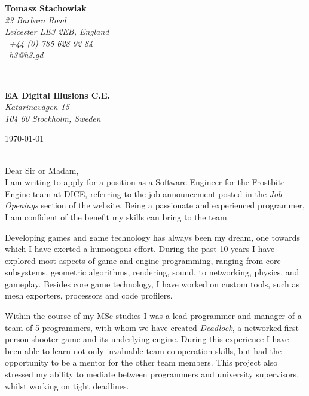 \documentclass[11pt]{article}
\begin{document}
\hfill%
\begin{minipage}[t]{.6\textwidth}
\raggedleft%
{\bfseries Tomasz Stachowiak}\\[.35ex]
\small\itshape%
23 Barbara Road\\
Leicester LE3 2EB, England\\[.35ex]
\Telefon~+44 (0) 785 628 92 84\\
\Letter~\href{mailto:h3@h3.gd}{h3@h3.gd}
\end{minipage}\\[1em]
%
\begin{minipage}[t]{.4\textwidth}
\raggedright%
{\bfseries EA Digital Illusions C.E.}\\[.35ex]
\small\itshape%
Katarinavägen 15\\
104 60 Stockholm, Sweden
\end{minipage}
\hfill %
\begin{minipage}[t]{.4\textwidth}
\raggedleft %
\today
\end{minipage}\\[2em]
Dear Sir or Madam,\\[1.5em]
%
I am writing to apply for a position as a Software Engineer for the Frostbite Engine team at DICE, referring to the job announcement posted in the \emph{Job Openings} section of the website. Being a passionate and experienced programmer, I am confident of the benefit my skills can bring to the team.

Developing games and game technology has always been my dream, one towards which I have exerted a humongous effort. During the past 10 years I have explored most aspects of game and engine programming, ranging from core subsystems, geometric algorithms, rendering, sound, to networking, physics, and gameplay. Besides core game technology, I have worked on custom tools, such as mesh exporters, processors and code profilers.

Within the course of my MSc studies I was a lead programmer and manager of a team of 5 programmers, with whom we have created \emph{Deadlock}, a networked first person shooter game and its underlying engine. During this experience I have been able to learn not only invaluable team co-operation skills, but had the opportunity to be a mentor for the other team members. This project also stressed my ability to mediate between programmers and university supervisors, whilst working on tight deadlines.
\end{document}

